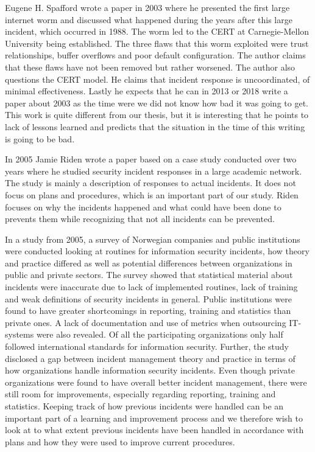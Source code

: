 Eugene H. Spafford \cite{spafford2003failure} wrote a paper in 2003 where he presented the first large internet worm and discussed what happened during the years after this large incident, which occurred in 1988. The worm led to the CERT at Carnegie-Mellon University being established. The three flaws that this worm exploited were trust relationships, buffer overflows and poor default configuration. The author claims that these flaws have not been removed but rather worsened. The author also questions the CERT model. He claims that incident response is uncoordinated, of minimal effectiveness. Lastly he expects that he can in 2013 or 2018 write a paper about 2003 as the time were we did not know how bad it was going to get. This work is quite different from our thesis, but it is interesting that he points to lack of lessons learned and predicts that the situation in the time of this writing is going to be bad.

In 2005 Jamie Riden \cite{riden2005responding} wrote a paper based on a case study conducted over two years where he studied security incident responses in a large academic network. The study is mainly a description of responses to actual incidents. It does not focus on plans and procedures, which is an important part of our study. Riden focuses on why the incidents happened and what could have been done to prevents them while recognizing that not all incidents can be prevented.

In a study from 2005\cite{brage}, a survey of Norwegian companies and public institutions were conducted looking at routines for information security incidents, how theory and practice differed as well as potential differences between organizations in public and private sectors. The survey showed that statistical material about incidents were inaccurate due to lack of implemented routines, lack of training and weak definitions of security incidents in general. Public institutions were found to have greater shortcomings in reporting, training and statistics than private ones. A lack of documentation and use of metrics when outsourcing IT-systems were also revealed. Of all the participating organizations only half followed international standards for information security. Further, the study disclosed a gap between incident management theory and practice in terms of how organizations handle information security incidents. Even though private organizations were found to have overall better incident management, there were still room for improvements, especially regarding reporting, training and statistics. Keeping track of how previous incidents were handled can be an important part of a learning and improvement process and we therefore wish to look at to what extent previous incidents have been handled in accordance with plans and how they were used to improve current procedures.

